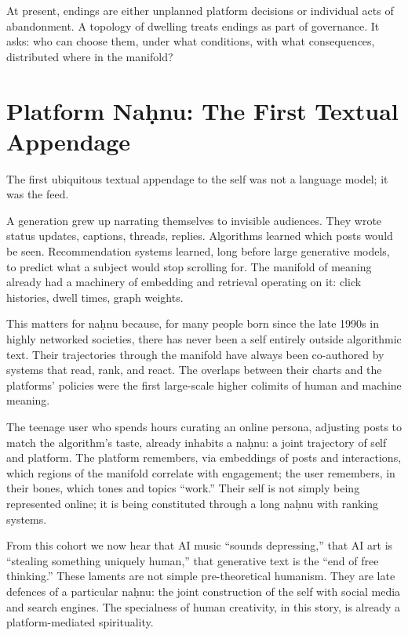 \documentclass[12pt,a4paper]{article}
\begin{document}
At present, endings are either unplanned platform decisions or individual acts of abandonment. A topology of dwelling treats endings as part of governance. It asks: who can choose them, under what conditions, with what consequences, distributed where in the manifold?

\section{Platform Na\d{h}nu: The First Textual Appendage}

The first ubiquitous textual appendage to the self was not a language model; it was the feed.

A generation grew up narrating themselves to invisible audiences. They wrote status updates, captions, threads, replies. Algorithms learned which posts would be seen. Recommendation systems learned, long before large generative models, to predict what a subject would stop scrolling for. The manifold of meaning already had a machinery of embedding and retrieval operating on it: click histories, dwell times, graph weights.

This matters for na\d{h}nu because, for many people born since the late 1990s in highly networked societies, there has never been a self entirely outside algorithmic text. Their trajectories through the manifold have always been co-authored by systems that read, rank, and react. The overlaps between their charts and the platforms' policies were the first large-scale higher colimits of human and machine meaning.

The teenage user who spends hours curating an online persona, adjusting posts to match the algorithm's taste, already inhabits a na\d{h}nu: a joint trajectory of self and platform. The platform remembers, via embeddings of posts and interactions, which regions of the manifold correlate with engagement; the user remembers, in their bones, which tones and topics ``work.'' Their self is not simply being represented online; it is being constituted through a long na\d{h}nu with ranking systems.

From this cohort we now hear that AI music ``sounds depressing,'' that AI art is ``stealing something uniquely human,'' that generative text is the ``end of free thinking.'' These laments are not simple pre-theoretical humanism. They are late defences of a particular na\d{h}nu: the joint construction of the self with social media and search engines. The specialness of human creativity, in this story, is already a platform-mediated spirituality.
\end{document}
